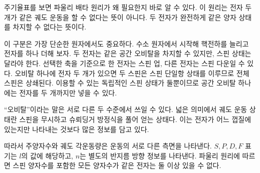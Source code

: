 주기율표를 보면 파울리 배타 원리가 왜 필요한지 바로 알 수 있다. 이 원리는 전자 두 개가 같은 궤도 운동을 할 수 없다는 뜻이 아니다. 두 전자가 완전하게 같은 양자 상태를 차지할 수 없다는 뜻이다.

이 구분은 가장 단순한 원자에서도 중요하다. 수소 원자에서 시작해 핵전하를 늘리고 전자를 하나 더해 보자. 두 전자는 같은 공간 오비탈을 차지할 수 있지만, 스핀 상태는 달라야 한다. 선택한 축을 기준으로 한 전자는 스핀 업, 다른 전자는 스핀 다운일 수 있다. 오비탈 하나에 전자 두 개가 있으면 두 스핀은 스핀 단일항 상태를 이루므로 전체 스핀은 상쇄된다. 이용할 수 있는 독립적인 스핀 상태가 둘뿐이므로 공간 오비탈 하나에는 전자를 두 개까지만 넣을 수 있다.

\begin{classroomqa}
\end{classroomqa}

``오비탈''이라는 말은 서로 다른 두 수준에서 쓰일 수 있다. 넓은 의미에서 궤도 운동 상태란 스핀을 무시하고 슈뢰딩거 방정식을 풀어 얻는 상태다. 이는 전자가 어느 껍질에 있는지만 나타내는 것보다 많은 정보를 담고 있다.

\begin{classroomqa}
\end{classroomqa}

따라서 주양자수와 궤도 각운동량은 운동의 서로 다른 측면을 나타낸다. \(S,P,D,F\) 표기는 \(l\)의 값에 해당하고, \(n\)는 별도의 반지름 방향 정보를 나타낸다. 파울리 원리에 따르면 스핀 양자수를 포함한 모든 양자수가 같은 전자는 둘 이상 있을 수 없다.

\begin{classroomqa}
\end{classroomqa}

